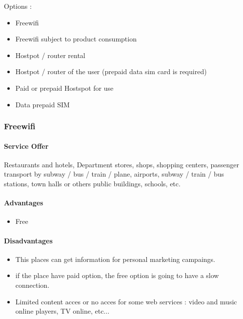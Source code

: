 \documentclass[12pt]{report}
\begin{document}
  Options :
  \begin{itemize}
    \item Freewifi
    \item Freewifi subject to product consumption
    \item Hostpot / router rental
    \item Hostpot / router of the user (prepaid data sim card is required)
    \item Paid or prepaid Hostspot for use
    \item Data prepaid SIM
  \end{itemize}

  \subsubsection{Freewifi} \label{ch:freeWifi}

  \paragraph*{Service Offer}

  Restaurants and hotels, Department stores, shops, shopping centers, passenger transport by subway / bus / train / plane,
  airports, subway / train / bus stations, town halls or others public buildings, schools, etc.

  \paragraph*{Advantages}

  \begin{itemize}
    \item Free
  \end{itemize}

  \paragraph*{Disadvantages}

  \begin{itemize}
    \item This places can get information for personal marketing campaings.
    \item if the place have paid option, the free option is going to have a slow connection.
    \item Limited content acces or no acces for some web services : video and music online players, TV online, etc...
  \end{itemize}
\end{document}

